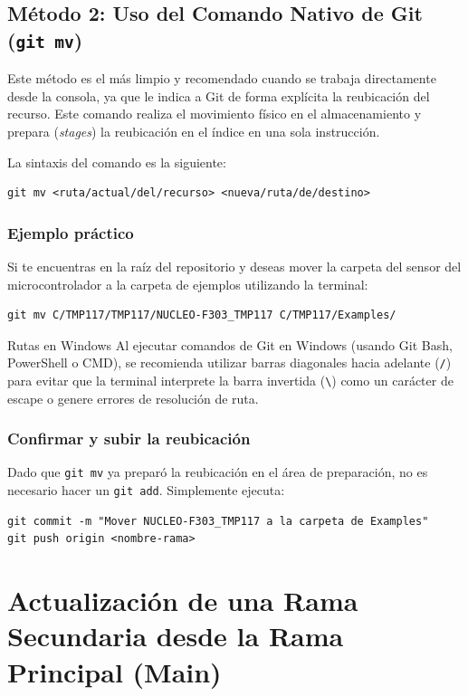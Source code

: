 \documentclass[
10pt, %
a4paper, %
oneside, %
headinclude,footinclude, %
BCOR5mm, %
]{scrartcl}
\begin{document}
\subsection{Método 2: Uso del Comando Nativo de Git (\texttt{git mv})}
Este método es el más limpio y recomendado cuando se trabaja directamente desde la consola, ya que le indica a Git de forma explícita la reubicación del recurso. Este comando realiza el movimiento físico en el almacenamiento y prepara (\textit{stages}) la reubicación en el índice en una sola instrucción.

La sintaxis del comando es la siguiente:
\begin{lstlisting}[language=DOS]
git mv <ruta/actual/del/recurso> <nueva/ruta/de/destino>
\end{lstlisting}

\subsubsection{Ejemplo práctico}
Si te encuentras en la raíz del repositorio y deseas mover la carpeta del sensor del microcontrolador a la carpeta de ejemplos utilizando la terminal:
\begin{lstlisting}[language=DOS]
git mv C/TMP117/TMP117/NUCLEO-F303_TMP117 C/TMP117/Examples/
\end{lstlisting}
\begin{InfoBox}{Rutas en Windows}
	Al ejecutar comandos de Git en Windows (usando Git Bash, PowerShell o CMD), se recomienda utilizar barras diagonales hacia adelante (\texttt{/}) para evitar que la terminal interprete la barra invertida (\texttt{\textbackslash}) como un carácter de escape o genere errores de resolución de ruta.
\end{InfoBox}

\subsubsection{Confirmar y subir la reubicación}
Dado que \texttt{git mv} ya preparó la reubicación en el área de preparación, no es necesario hacer un \texttt{git add}. Simplemente ejecuta:
\begin{lstlisting}[language=DOS]
git commit -m "Mover NUCLEO-F303_TMP117 a la carpeta de Examples"
git push origin <nombre-rama>
\end{lstlisting}

\newpage
\section{Actualización de una Rama Secundaria desde la Rama Principal (Main)}
\end{document}
